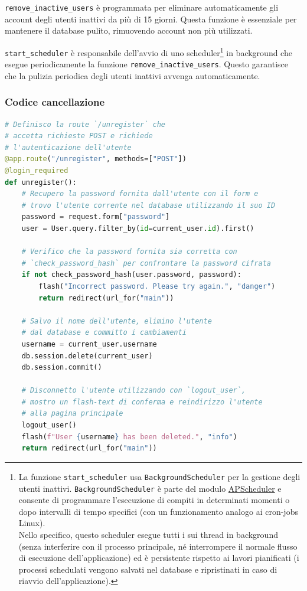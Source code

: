 \documentclass[12pt]{report}
\begin{document}
\texttt{remove\_inactive\_users} è programmata per eliminare automaticamente gli account degli utenti inattivi da più di 15 giorni. Questa funzione è essenziale per mantenere il database pulito, rimuovendo account non più utilizzati.

\texttt{start\_scheduler} è responsabile dell'avvio di uno scheduler\footnote{La funzione \texttt{start\_scheduler} usa \texttt{BackgroundScheduler} per la gestione degli utenti inattivi. \texttt{BackgroundScheduler} è parte del modulo \href{https://apscheduler.readthedocs.io/en/stable/}{\textsf{APScheduler}} e consente di programmare l'esecuzione di compiti in determinati momenti o dopo intervalli di tempo specifici (con un funzionamento analogo ai cron-jobs Linux).\\
Nello specifico, questo scheduler esegue tutti i sui thread in background (senza interferire con il processo principale, né interrompere il normale flusso di esecuzione dell'applicazione) ed è persistente rispetto ai lavori pianificati (i processi schedulati vengono salvati nel database e ripristinati in caso di riavvio dell'applicazione).} in background che esegue periodicamente la funzione \texttt{remove\_inactive\_users}. Questo garantisce che la pulizia periodica degli utenti inattivi avvenga automaticamente.


\subsubsection{Codice cancellazione}
\begin{lstlisting}[language=Python]
# Definisco la route `/unregister` che
# accetta richieste POST e richiede
# l'autenticazione dell'utente
@app.route("/unregister", methods=["POST"])
@login_required
def unregister():
    # Recupero la password fornita dall'utente con il form e
    # trovo l'utente corrente nel database utilizzando il suo ID
    password = request.form["password"]
    user = User.query.filter_by(id=current_user.id).first()

    # Verifico che la password fornita sia corretta con
    # `check_password_hash` per confrontare la password cifrata
    if not check_password_hash(user.password, password):
        flash("Incorrect password. Please try again.", "danger")
        return redirect(url_for("main"))

    # Salvo il nome dell'utente, elimino l'utente
    # dal database e committo i cambiamenti
    username = current_user.username
    db.session.delete(current_user)
    db.session.commit()

    # Disconnetto l'utente utilizzando con `logout_user`,
    # mostro un flash-text di conferma e reindirizzo l'utente
    # alla pagina principale
    logout_user()
    flash(f"User {username} has been deleted.", "info")
    return redirect(url_for("main"))
\end{lstlisting}
\end{document}
